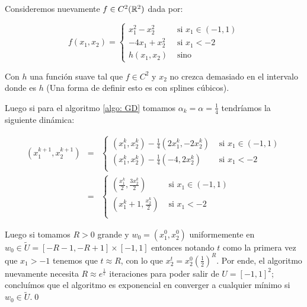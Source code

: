 \begin{example}
	Consideremos nuevamente $f \in C^2({\mathbb{R}}^2)$ dada por:
	
	\begin{equation*}
		f(x_1, x_2) = \left\lbrace \begin{array}{cc}
		x_1^2 - x_2^2 & \text{ si } x_1 \in (-1,1) \\
		-4x_1 + x_2^2 & \text{ si } x_1 < -2 \\
		h(x_1,x_2) & \text{ sino }
		\end{array}\right.
	\end{equation*}
	
	Con $h$ una funci\'on suave tal que $f \in C^2$ y $x_2$ no crezca demasiado en el intervalo donde es $h$ (Una forma de definir esto es con splines c\'ubicos).
	
	Luego si para el algoritmo \ref{algo: GD} tomamos $\alpha_k = \alpha = \frac{1}{4}$ tendr\'iamos la siguiente din\'amica:
	
	\begin{equation*}
	\begin{array}{rcl}
	\left(x_1^{k+1}, x^{k+1}_2\right) & = & \left\lbrace\begin{array}{cc}
	\left(x^k_1, x^k_2\right)- \frac{1}{4} \left(2x^k_1, -2x^k_2\right) & \text{ si } x_1 \in (-1,1) \\
	\left(x^k_1, x^k_2\right)- \frac{1}{4} \left(-4, 2x^k_2\right) & \text{ si } x_1 < -2 \\
	\end{array}\right. \\
	& = & \left\lbrace\begin{array}{cc}
	\left(\frac{x^k_1}{2}, \frac{3 x^k_2}{2}\right) & \text{ si } x_1 \in (-1,1) \\
	\left(x^k_1 + 1, \frac{x^k_2}{2}\right) & \text{ si } x_1 < -2 \\
	\end{array}\right.
	\end{array}
	\end{equation*}
	
	Luego si tomamos $R >0$ grande y $w_0 = (x_1^0, x_2^0)$ uniformemente en $w_0\in \widetilde{U} = \left[ -R-1, -R+1 \right]\times [-1,1]$ entonces notando $t$ como la primera vez que $x_1 > -1$ tenemos que $t \approx R$, con lo que $x_2^t = x_2^0 \left(\frac{1}{2}\right)^R$. Por ende, el algoritmo nuevamente  necesita $R \approx e^{\frac{1}{\epsilon}}$ iteraciones para poder salir de $U = [-1,1]^2$; conclu\'imos que el algoritmo es exponencial en converger a cualquier m\'inimo si $w_0 \in \widetilde{U}$.\qed 
	
\end{example}

